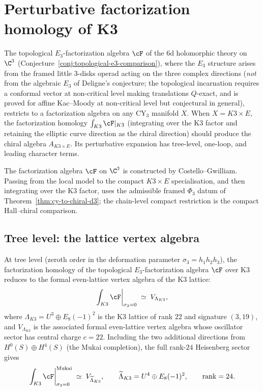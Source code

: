 \section{Perturbative factorization homology of K3}
\label{sec:k3-perturbative-fact-homology}

The topological $E_3$-factorization algebra $\cF$ of the 6d holomorphic
theory on $\C^3$ (Conjecture~\ref{conj:topological-e3-comparison}), where
the $E_3$ structure arises from the framed little $3$-disks operad
acting on the three complex directions (\emph{not} from the algebraic
$E_3$ of Deligne's conjecture; the topological incarnation requires a conformal vector at non-critical level making translations $Q$-exact, and is proved for affine Kac--Moody at non-critical level but conjectural in general), restricts to a factorization
algebra on any CY$_3$ manifold $X$.
When $X = K3 \times E$, the factorization homology
$\int_{K3} \cF|_{K3}$ (integrating over the K3 factor and retaining
the elliptic curve direction as the chiral direction) should
produce the chiral algebra $A_{K3 \times E}$. Its perturbative expansion
has tree-level, one-loop, and leading character terms.

The factorization algebra $\cF$ on $\C^3$ is constructed by
Costello--Gwilliam. Passing from the local model to the compact
$K3\times E$ specialisation, and then integrating over the K3 factor,
uses the admissible framed $\Phi_3$ datum of
Theorem~\ref{thm:cy-to-chiral-d3}; the chain-level compact restriction is
the compact Hall--chiral comparison.

\subsection{Tree level: the lattice vertex algebra}
\label{subsec:k3-fact-tree}

\begin{conjecture}
\label{conj:k3-fact-tree-level}
\ClaimStatusConjectured
At tree level (zeroth order in the deformation parameter
$\sigma_3 = h_1 h_2 h_3$), the factorization homology of the
topological $E_3$-factorization algebra $\cF$ over K3 reduces to the
formal even-lattice vertex algebra of the K3 lattice:
\begin{equation}\label{eq:k3-fact-tree}
 \int_{K3} \cF\bigg|_{\sigma_3 = 0}
 \;\simeq\;
 V_{\Lambda_{K3}},
\end{equation}
where $\Lambda_{K3} = U^3 \oplus E_8(-1)^2$ is the K3 lattice of
rank $22$ and signature $(3,19)$, and $V_{\Lambda_{K3}}$ is the
associated formal even-lattice vertex algebra whose oscillator sector
has central charge $c = 22$.
Including the two additional directions from $H^0(S) \oplus H^4(S)$
(the Mukai completion), the full rank-$24$ Heisenberg sector gives
\begin{equation}\label{eq:k3-fact-tree-full}
 \int_{K3} \cF\bigg|_{\sigma_3 = 0}^{\mathrm{Mukai}}
 \;\simeq\;
 V_{\widetilde{\Lambda}_{K3}},
 \qquad
 \widetilde{\Lambda}_{K3}
 = U^4 \oplus E_8(-1)^2,
 \qquad
 \operatorname{rank} = 24.
\end{equation}
\end{conjecture}

